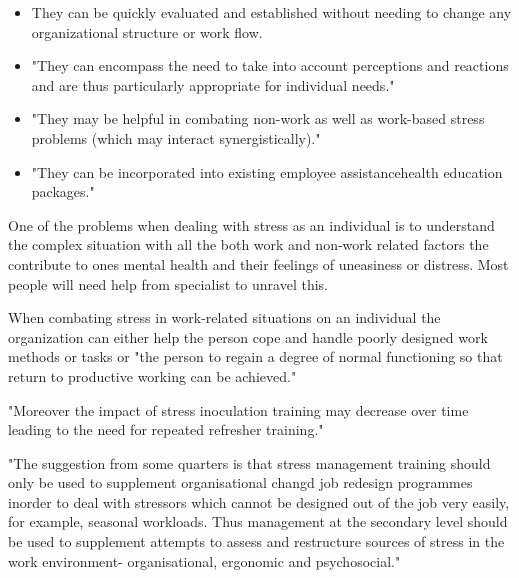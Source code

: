 \begin{itemize}
\item They can be quickly evaluated and established without needing to change any organizational structure or work flow.
\item "They can encompass the need to take into account perceptions and reactions and are thus particularly appropriate for individual needs."
\item "They may be helpful in combating non-work as well as work-based stress problems (which may interact synergistically)."
\item "They can be incorporated into existing employee assistancehealth education packages."
\end{itemize}

One of the problems when dealing with stress as an individual is to understand the complex situation with all the both work and non-work related factors the contribute to ones mental health and their feelings of uneasiness or distress. Most people will need help from specialist to unravel this.

When combating stress in work-related situations on an individual the organization can either help the person cope and handle poorly designed work methods or tasks or "the person to regain a degree of normal functioning so that return to productive working can be achieved."

"Moreover the impact of stress inoculation training may decrease over time leading to the need for repeated refresher training."

"The suggestion from some quarters is that stress management training should only be used to supplement organisational changd job redesign programmes inorder to deal with stressors which cannot be designed out of the job very easily, for example, seasonal workloads. Thus management at the secondary level should be used to supplement attempts to assess and restructure sources of stress in the work environment- organisational, ergonomic and psychosocial."